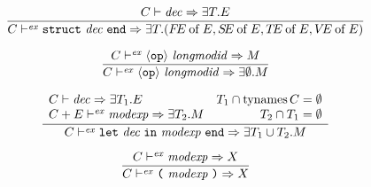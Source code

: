 \begin{equation}	%
\label{decatmodexp-rule}
\frac{\C\ts\dec\ra\EXISTS{\T}{\E}}
     {\C\ts^\expect\decatmodexp\ra\exmod{\T}{(\of{\FE}{\E},\of{\SE}{\E},\of{\TE}{\E},\of{\VE}{\E})}}\index{39.2}
\end{equation}

\begin{equation}	%
\label{longmodid-rule}
\frac{\C\ts^\expect\opp\ \longmodid\ra\M}
     {\C\ts^\expect\opp\ \longmodid\ra\exmod{\emptyset}{\M}}
\end{equation}



\begin{equation}	%
\label{letatmodexp-rule}
\frac{\begin{array}{lr}
      \C\ts\dec\ra\EXISTS{\T_1}{\E} &
       \T_1 \cap \TyNamesFcn \C = \emptyset \\
      \C+\E\ts^\expect\modexp\ra\exmod{\T_2}{\M} &
      \T_2 \cap T_1 = \emptyset 
      \end{array}}
     {\C\ts^\expect\letatmodexp\ra\exmod{\T_1 \cup \T_2}{\M}}
\end{equation}


\begin{equation}	%
\label{paratmodexp}
\frac{\C\ts^\expect\modexp\ra\XM}
     {\C\ts^\expect\paratmodexp\ra\XM}
\end{equation}

